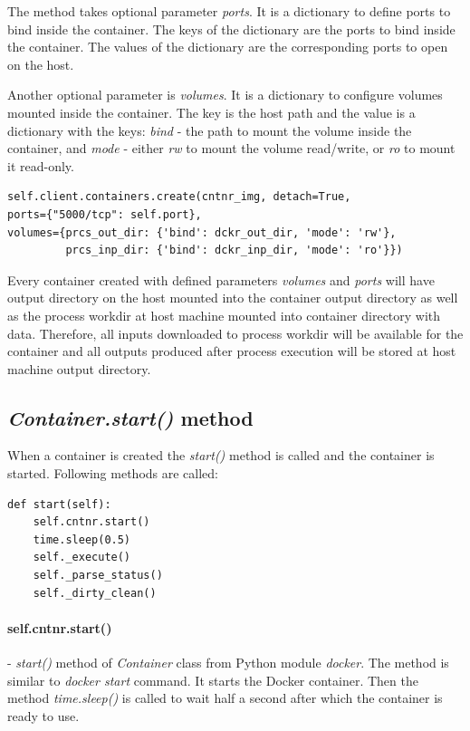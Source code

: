 \documentclass[12pt,a4paper]{article}
\begin{document}
The method takes optional parameter \textit{ports}. It is a dictionary to define ports to bind inside the container. The keys of the
dictionary are the ports to bind inside the container. The values of the dictionary are the corresponding ports to open on the host.

Another optional parameter is \textit{volumes}. It is a dictionary 
to configure volumes mounted inside the container. The key is the host path and the value is a dictionary with the keys: \textit{bind}
- the path to mount the volume inside the container, and \textit{mode} - either \textit{rw} to mount the volume read/write, or 
\textit{ro} to mount it read-only.

\bigskip
\begin{lstlisting}[basicstyle=\small,caption={\textit{create()} method}]
self.client.containers.create(cntnr_img, detach=True,
ports={"5000/tcp": self.port}, 
volumes={prcs_out_dir: {'bind': dckr_out_dir, 'mode': 'rw'},
         prcs_inp_dir: {'bind': dckr_inp_dir, 'mode': 'ro'}})
\end{lstlisting}

Every container created with defined parameters \textit{volumes} and \textit{ports} will have output directory on the host mounted into 
the container output directory as well as the process workdir at host machine mounted into container directory with data. Therefore, all
inputs downloaded to process workdir will be available for the container and all outputs produced after process execution will be stored
at host machine output directory.

\subsection{\textit{Container.start()} method}
When a container is created the \textit{start()} method is called and the container is started. Following methods are called:

\begin{lstlisting}[basicstyle=\small,caption={\textit{create()} method}]
def start(self):
    self.cntnr.start()
    time.sleep(0.5)
    self._execute()
    self._parse_status()
    self._dirty_clean()
\end{lstlisting}


\paragraph{self.cntnr.start()} - \textit{start()} method of \textit{Container} class from Python module \textit{docker}.
The method is similar to \textit{docker start} command. It starts the Docker container. Then the method \textit{time.sleep()} is 
called to wait half a second after which the container is ready to use.
\end{document}
